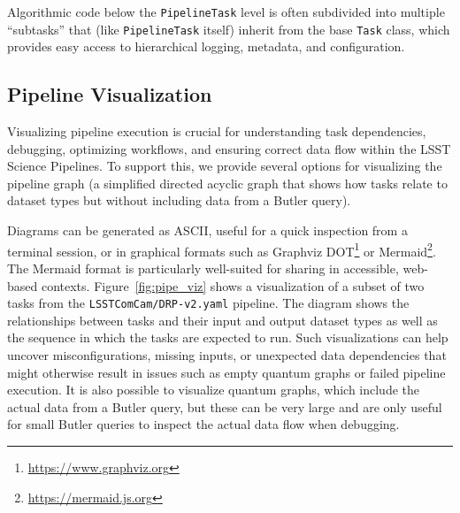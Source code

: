 Algorithmic code below the \texttt{PipelineTask} level is often subdivided into multiple ``subtasks'' that (like \texttt{PipelineTask} itself) inherit from the base \texttt{Task} class, which provides easy access to hierarchical logging, metadata, and configuration.

\subsection{Pipeline Visualization}
\label{sec:pipeline_visualization}

Visualizing pipeline execution is crucial for understanding task dependencies, debugging, optimizing workflows, and ensuring correct data flow within the LSST Science Pipelines.
To support this, we provide several options for visualizing the pipeline graph (a simplified directed acyclic graph that shows how tasks relate to dataset types but without including data from a Butler query).

Diagrams can be generated as ASCII, useful for a quick inspection from a terminal session, or in graphical formats such as Graphviz DOT\footnote{\url{https://www.graphviz.org}} or Mermaid\footnote{\url{https://mermaid.js.org}}.
The Mermaid format is particularly well-suited for sharing in accessible, web-based contexts.
Figure~\ref{fig:pipe_viz} shows a visualization of a subset of two tasks from the \texttt{LSSTComCam/DRP-v2.yaml} pipeline.
The diagram shows the relationships between tasks and their input and output dataset types as well as the sequence in which the tasks are expected to run.
Such visualizations can help uncover misconfigurations, missing inputs, or unexpected data dependencies that might otherwise result in issues such as empty quantum graphs or failed pipeline execution.
It is also possible to visualize quantum graphs, which include the actual data from a Butler query, but these can be very large and are only useful for small Butler queries to inspect the actual data flow when debugging.

\begin{figure*}
    \centering
    \caption{
        Example pipeline visualization of four selected tasks from the \texttt{LSSTComCam/DRP-v2.yaml} pipeline generated using Mermaid.
        The diagram illustrates the flow of datasets between tasks, with dashed lines indicating prerequisite inputs.
        This visualization helps validate task dependencies and the expected sequence of execution.
    }
    \label{fig:pipe_viz}
\end{figure*}

